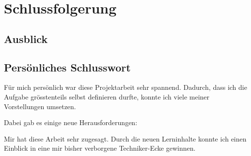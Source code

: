 \chapter{Schlussfolgerung}


\section{Ausblick}

\section{Persönliches Schlusswort}
Für mich persönlich war diese Projektarbeit sehr spannend.
Dadurch, dass ich die Aufgabe grösstenteils selbst definieren durfte, konnte ich viele meiner Vorstellungen umsetzen.

Dabei gab es einige neue Herausforderungen:


Mir hat diese Arbeit sehr zugesagt.
Durch die neuen Lerninhalte konnte ich einen Einblick in eine mir bisher verborgene Techniker-Ecke gewinnen.
